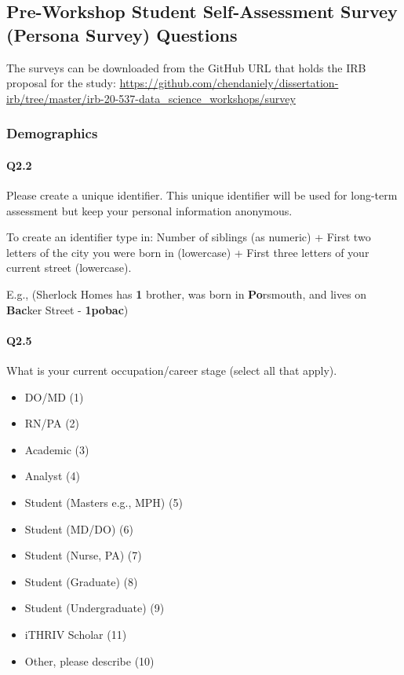 \documentclass[020-persona\_validation.tex]{subfiles}
\begin{document}
\subsection{Pre-Workshop Student Self-Assessment Survey (Persona Survey) Questions}

The surveys can be downloaded from the GitHub URL that holds the IRB proposal for the study:
\url{https://github.com/chendaniely/dissertation-irb/tree/master/irb-20-537-data\_science_workshops/survey}

    \subsubsection{Demographics}

        \paragraph{Q2.2}

            Please create a unique identifier.
            This unique identifier will be used for long-term assessment but keep your personal information anonymous.

            To create an identifier type in:
            Number of siblings (as numeric) +
            First two letters of the city you were born in (lowercase) +
            First three letters of your current street (lowercase).

            E.g., (Sherlock Homes has \textbf{1} brother,
                was born in \textbf{Po}rsmouth,
                and lives on \textbf{Bac}ker Street - \textbf{1pobac})

        \paragraph{Q2.5}

            What is your current occupation/career stage (select all that apply).

            \begin{itemize}
                \item DO/MD  (1)
                \item RN/PA  (2)
                \item Academic  (3)
                \item Analyst  (4)
                \item Student (Masters e.g., MPH)  (5)
                \item Student (MD/DO)  (6)
                \item Student (Nurse, PA)  (7)
                \item Student (Graduate)  (8)
                \item Student (Undergraduate)  (9)
                \item iTHRIV Scholar  (11)
                \item Other, please describe  (10)
            \end{itemize}
\end{document}
